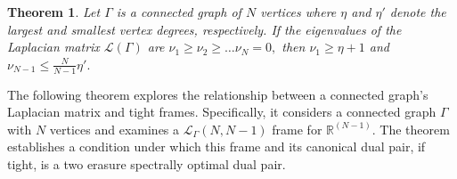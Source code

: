 \documentclass[final,1p,times]{elsarticle}
\newtheorem{thm}{Theorem}[section]
\begin{document}
\begin{thm}\cite{bapat}\label{thm5point1}
	Let $\Gamma$ is a connected graph of $N$ vertices where $\eta$ and $\eta'$ denote the largest and smallest vertex degrees, respectively. If the eigenvalues of the Laplacian matrix $\mathcal{L}(\Gamma)$ are $\nu_1 \geq \nu_2 \geq \ldots \nu_N =0,$ then $\nu_1 \geq \eta + 1$ and $\nu_{N-1} \leq \frac{N}{N-1}\eta'.$
\end{thm}
The following theorem explores the relationship between a connected graph's Laplacian matrix and tight frames. Specifically, it considers a connected graph $\Gamma$ with $N$ vertices and examines a $\mathcal{L}_{\Gamma}(N,N-1)$ frame for $\mathbb{R}^{(N-1)}.$ The theorem establishes a condition under which this frame and its canonical dual pair, if tight,  is a two erasure spectrally optimal dual pair.
\end{document}
